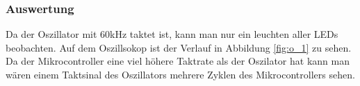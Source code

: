 \documentclass[12pt,a4paper]{article}
\begin{document}
\subsubsection*{Auswertung}

Da der Oszillator mit 60kHz taktet ist, kann man nur ein leuchten aller LEDs beobachten. Auf dem Oszillsokop ist der Verlauf in Abbildung \ref{fig:o_1} zu sehen. Da der Mikrocontroller eine viel höhere Taktrate als der Oszilator hat kann man wären einem Taktsinal des Oszillators mehrere Zyklen des Mikrocontrollers sehen.
\end{document}
